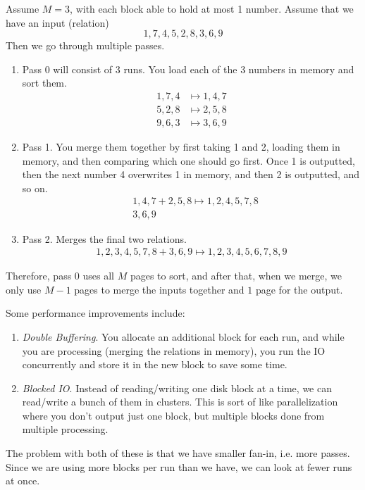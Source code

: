     \begin{example}
      Assume $M = 3$, with each block able to hold at most 1 number. Assume that we have an input (relation) 
      \begin{equation}
        1, 7, 4, 5, 2, 8, 3, 6, 9
      \end{equation}
      Then we go through multiple passes. 
      \begin{enumerate}
        \item Pass 0 will consist of 3 runs. You load each of the 3 numbers in memory and sort them.  
          \begin{align}
            1, 7, 4 & \mapsto 1, 4, 7 \\ 
            5, 2, 8 & \mapsto 2, 5, 8 \\ 
            9, 6, 3 & \mapsto 3, 6, 9
          \end{align}

        \item Pass 1. You merge them together by first taking 1 and 2, loading them in memory, and then comparing which one should go first. Once 1 is outputted, then the next number 4 overwrites 1 in memory, and then 2 is outputted, and so on. 
          \begin{align}
            & 1, 4, 7 + 2, 5, 8 \mapsto 1, 2, 4, 5, 7, 8 \\ 
            & 3, 6, 9
          \end{align}

        \item Pass 2. Merges the final two relations. 
          \begin{align}
            1, 2, 3, 4, 5, 7, 8 + 3, 6, 9 \mapsto 1, 2, 3, 4, 5, 6, 7, 8, 9
          \end{align}
      \end{enumerate}
      Therefore, pass 0 uses all $M$ pages to sort, and after that, when we merge, we only use $M-1$ pages to merge the inputs together and $1$ page for the output. 
    \end{example}

    Some performance improvements include: 
    \begin{enumerate}
      \item \textit{Double Buffering}. You allocate an additional block for each run, and while you are processing (merging the relations in memory), you run the IO concurrently and store it in the new block to save some time. 
      \item \textit{Blocked IO}. Instead of reading/writing one disk block at a time, we can read/write a bunch of them in clusters. This is sort of like parallelization where you don't output just one block, but multiple blocks done from multiple processing. 
    \end{enumerate}
    The problem with both of these is that we have smaller fan-in, i.e. more passes. Since we are using more blocks per run than we have, we can look at fewer runs at once. 

